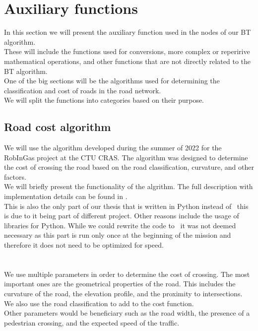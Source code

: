 \section{Auxiliary functions}
    In this section we will present the auxiliary function used in the nodes of our BT algorithm.\\
    These will include the functions used for conversions, more complex or reperirive mathematical operations, and other functions that are not directly related to the BT algorithm.\\
    One of the big sections will be the algorithms used for determining the classification and cost of roads in the road network.\\
    We will split the functions into categories based on their purpose.

    \subsection{Road cost algorithm}
        We will use the algorithm developed during the summer of 2022 for the RobInGas project at the CTU CRAS. The algorithm was designed to determine the cost of crossing the road based on the road classification, curvature, and other factors.\\
        We will briefly present the functionality of the algrithm. The full description with implementation details can be found in \cite{Road_cost_docs}.\\
        This is also the only part of our thesis that is written in Python instead of \CC\ this is due to it being part of different project. Other reasons include the usage of libraries for Python. While we could rewrite the code to \CC\ it was not deemed necessary as this part is run only once at the beginning of the mission and therefore it does not need to be optimized for speed.\\\\
        \\
            We use multiple parameters in order to determine the cost of crossing. The most important ones are the geometrical properties of the road. This includes the curvature of the road, the elevation profile, and the proximity to intersections. We also use the road classification to add to the cost function.\\
            Other parameters would be beneficiary such as the road width, the presence of a pedestrian crossing, and the expected speed of the traffic.\\
